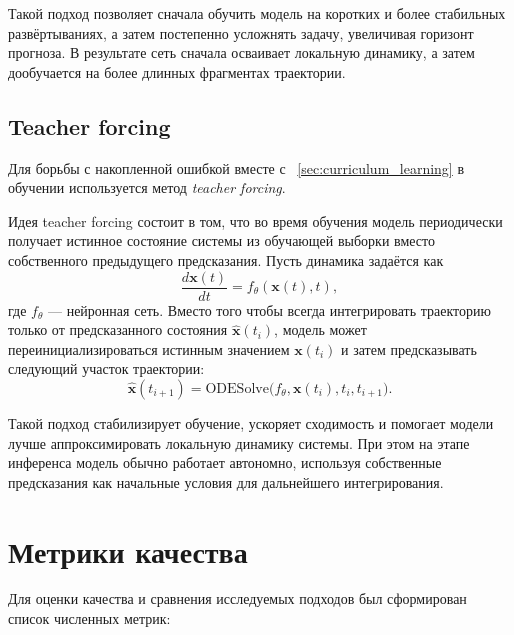 \documentclass[PMI,VKR]{HSEUniversity}
\begin{document}
Такой подход позволяет сначала обучить модель на коротких и более
стабильных развёртываниях, а затем постепенно усложнять задачу,
увеличивая горизонт прогноза. В результате сеть сначала осваивает
локальную динамику, а затем дообучается на более длинных фрагментах
траектории.

\subsection{Teacher forcing}

Для борьбы с накопленной ошибкой вместе с ~\ref{sec:curriculum_learning} в обучении используется метод \textit{teacher forcing}.

Идея teacher forcing состоит в том, что во время обучения модель периодически получает истинное состояние системы из обучающей выборки вместо собственного предыдущего предсказания. Пусть динамика задаётся как
\[
    \frac{d\mathbf{x}(t)}{dt} = f_\theta(\mathbf{x}(t), t),
\]
где $f_\theta$ --- нейронная сеть. Вместо того чтобы всегда интегрировать траекторию только от предсказанного состояния $\hat{\mathbf{x}}(t_i)$, модель может переинициализироваться истинным значением $\mathbf{x}(t_i)$ и затем предсказывать следующий участок траектории:
\[
    \hat{\mathbf{x}}(t_{i+1}) =
    \mathrm{ODESolve}\bigl(f_\theta, \mathbf{x}(t_i), t_i, t_{i+1}\bigr).
\]

Такой подход стабилизирует обучение, ускоряет сходимость и помогает модели лучше аппроксимировать локальную динамику системы. При этом на этапе инференса модель обычно работает автономно, используя собственные предсказания как начальные условия для дальнейшего интегрирования.

\section{Метрики качества}

Для оценки качества и сравнения исследуемых подходов был сформирован список численных метрик:
\end{document}
